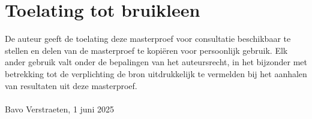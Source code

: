 \documentclass[12pt]{article}
\begin{document}
\section*{Toelating tot bruikleen}
De auteur geeft de toelating deze masterproef voor consultatie beschikbaar te stellen en delen van de masterproef te kopiëren voor persoonlijk gebruik. Elk ander gebruik valt onder de bepalingen van het auteursrecht, in het bijzonder met betrekking tot de verplichting de bron uitdrukkelijk te vermelden bij het aanhalen van resultaten uit deze masterproef.
\\\\
Bavo Verstraeten, 1 juni 2025
\begin{titlepage}
\centering
\tableofcontents
\end{titlepage}
\setcounter{page}{1}
\end{document}
